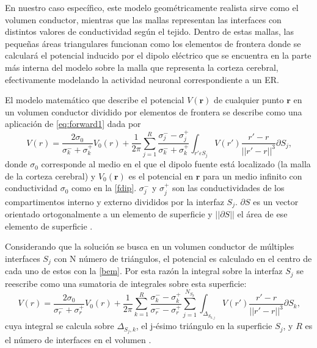 En nuestro caso específico, este modelo geométricamente realista sirve como el volumen conductor, mientras que las mallas representan las interfaces con distintos valores de conductividad según el tejido.
Dentro de estas mallas, las pequeñas áreas triangulares funcionan como los elementos de frontera donde se calculará el potencial inducido por el dipolo eléctrico que se encuentra en la parte más interna del modelo sobre la malla que representa la corteza cerebral, efectivamente modelando la actividad neuronal correspondiente a un ER.

El modelo matemático que describe el potencial $V(\mathbf{r})$ de cualquier punto $\mathbf{r}$ en un volumen conductor dividido por elementos de frontera se describe como una aplicación de \cref{eq:forward1} dada por
\begin{equation}
	\label{bem}
	V(r) = \frac{2\sigma_{0}}{\sigma_{k}^{-} + {\sigma_{k}^{+}}} V_{0}(r) + \frac{1}{2\pi} \sum_{j=1}^{R}\frac{\sigma_{j}^{-}-\sigma_{j}^{+}}{\sigma_{k}^{-}+\sigma_{k}^{+}} \int_{r'\varepsilon S_{j}} V(r') \frac{r'-r}{||r'-r||^3}\partial S_{j}\text{,}
\end{equation}
donde $\sigma_{0}$ corresponde al medio en el que el dipolo fuente está localizado (la malla de la corteza cerebral) y $V_{0}(\mathbf{r})$ es el potencial en $\mathbf{r}$ para un medio infinito con conductividad $\sigma_{0}$ como en la \cref{fdip}.
$\sigma_{j}^{-}$ y $\sigma_{j}^{+}$ son las conductividades de los compartimentos interno y externo divididos por la interfaz $S_{j}$. $\partial S$ es un vector orientado ortogonalmente a un elemento de superficie y $||\partial S||$ el área de ese elemento de superficie \cite{Hallez2007}.

Considerando que la solución se busca en un volumen conductor de múltiples interfaces $S_{j}$ con N número de triángulos, el potencial es calculado en el centro de cada uno de estos con la \cref{bem}.
Por esta razón la integral sobre la interfaz $S_{j}$ se reescribe como una sumatoria de integrales sobre esta superficie:
\begin{equation}
	\label{bem2}
	V(r) = \frac{2\sigma_{0}}{\sigma_{r}^{-} + {\sigma_{r}^{+}}} V_{0}(r) + \frac{1}{2\pi} \sum_{k=1}^{R}\frac{\sigma_{k}^{-}-\sigma_{k}^{+}}{\sigma_{r}^{-}-\sigma_{r}^{+}} \sum_{j=1}^{N_{S_{k}}} \int_{\Delta_{S_{k,j}}} V(r') \frac{r'-r}{||r'-r||^3}\partial S_{k}\text{,}
\end{equation}
cuya integral se calcula sobre $\Delta_{S_{j},k}$, el j-ésimo triángulo en la superficie $S_{j}$, y $R$ es el número de interfaces en el volumen \cite{Hallez2007}.

